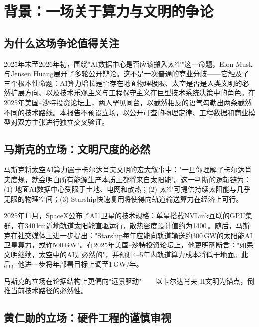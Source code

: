 
\section{背景：一场关于算力与文明的争论}

\subsection{为什么这场争论值得关注}

2025年末至2026年初，围绕"AI数据中心是否应该搬入太空"这一命题，Elon Musk与Jensen Huang展开了多轮公开辩论。这不是一次普通的商业分歧——它触及了三个根本性命题：AI算力增长是否存在地面物理极限、太空是否是人类文明的必然扩展方向、以及技术乐观主义与工程保守主义在巨型技术系统决策中的角色。在2025年美国--沙特投资论坛上，两人罕见同台\cite{musk_huang2025saudi}，以截然相反的语气勾勒出两条截然不同的技术路线。本报告不预设立场，以公开可查的物理定律、工程数据和商业模型对双方主张进行独立交叉验证。

\subsection{马斯克的立场：文明尺度的必然}

马斯克将太空AI算力置于卡尔达肖夫文明的宏大叙事中："一旦你理解了卡尔达肖夫度规，就会明白所有能源生产本质上都将来自太阳能"\cite{musk2024kardashev}。这一判断的逻辑链为：(1) 地面AI数据中心受限于土地、电网和散热；(2) 太空可提供持续太阳能与几乎无限的物理空间；(3) Starship快速复用将使得向轨道输送算力在经济上可行。

2025年11月，SpaceX公布了AI1卫星的技术规格：单星搭载NVLink互联的GPU集群，在340\,km近地轨道太阳能直驱运行，散热密度设计值约为1400\,\unitWpm{}\cite{spacex2026ai1}。随后，马斯克在社交媒体上进一步提出："Starship每年应能向轨道输送约300\,GW的太阳能AI卫星算力，或许500\,GW"\cite{musk2025starship}。在2025年美国--沙特投资论坛上，他更明确断言："如果文明继续，太空中的AI是必然的"\cite{musk2025us_saudi}，并预测4--5年内轨道算力成本将低于地面\cite{musk2025lunar}。此后，他进一步将年部署目标上调至1\,GW/年\cite{musk2026terafab}。

马斯克的立场在论据结构上更偏向"远景驱动"——以卡尔达肖夫-II文明为锚点，倒推当前技术路径的必然性。

\subsection{黄仁勋的立场：硬件工程的谨慎审视}

